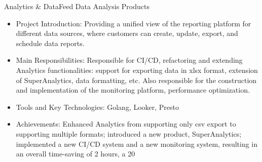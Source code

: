 \documentclass{resume}
\begin{document}
Analytics \& DataFeed Data Analysis Products
\begin{itemize}
\item Project Introduction: Providing a unified view of the reporting platform for different data sources, where customers can create, update, export, and schedule data reports.
\item Main Responsibilities: Responsible for CI/CD, refactoring and extending Analytics functionalities: support for exporting data in xlsx format, extension of SuperAnalytics, data formatting, etc. Also responsible for the construction and implementation of the monitoring platform, performance optimization.
\item Tools and Key Technologies: Golang, Looker, Presto
\item Achievements: Enhanced Analytics from supporting only csv export to supporting multiple formats; introduced a new product, SuperAnalytics; implemented a new CI/CD system and a new monitoring system, resulting in an overall time-saving of 2 hours, a 20%
\end{itemize}
\end{document}
